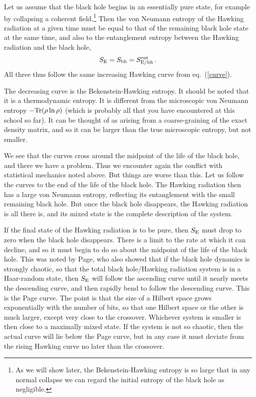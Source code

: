 \documentclass[12pt]{article}
\newcommand{\be}{\begin{equation}}
\newcommand{\ee}{\end{equation}}
\newcommand{\rmx}{\rm}
\begin{document}
Let us assume that the black hole begins in an essentially pure state, for example by collapsing a coherent field.\footnote{As we will show later, the Bekenstein-Hawking entropy is so large that in any normal collapse we can regard the initial entropy of the black hole as negligible.}  
Then the von Neumann entropy of the Hawking radiation at a given time must be equal to that of the remaining black hole state at the same time, and also to the entanglement entropy between the Hawking radiation and the black hole,
\be
S_{\rmx E} = S_{\rmx bh} = S^{\rmx ent}_{\rmx E/bh} \,.
\ee
All three thus follow the same increasing Hawking curve from eq.~(\ref{curve}).

The decreasing curve is the Bekenstein-Hawking entropy.  It should be noted that it is a thermodynamic entropy.  It is different from the microscopic von Neumann entropy $-\rm Tr( \rho\ln \rho)$ (which is probably all that you have encountered at this school so far).  It can be thought of as arising from a coarse-graining of the exact density matrix, and so it can be larger than the true microscopic entropy, but not smaller.  

We see that the curves cross around the midpoint of the life of the black hole, and there we have a problem.  Thus we encounter again the conflict with statistical mechanics noted above.
But things are worse than this.  Let us follow the curves to the end of the life of the black hole.  The Hawking radiation then has a large von Neumann entropy, reflecting its entanglement with the small remaining black hole.  But once the black hole disappears, the Hawking radiation is all there is, and its mixed state is the complete description of the system. 

If the final state of the Hawking radiation is to be pure, then $S_{\rmx E}$ must drop to zero when the black hole disappears.  There is a limit to the rate at which it can decline, and so it must begin to do so about the midpoint of the life of the black hole. This was noted by Page, who also showed that if the black hole dynamics is strongly chaotic, so that the total black hole/Hawking radiation system is in a Haar-random state, then $S_{\rmx E}$ will follow the ascending curve until it nearly meets the descending curve, and then rapidly bend  to follow the descending curve.  This is the Page curve\label{page}.
The point is that the size of a Hilbert space grows exponentially with the number of bits, so that one Hilbert space or the other is much larger, except very close to the crossover.  Whichever system is smaller is then close to a maximally mixed state.  
If the system is not so chaotic, then the actual curve will lie below the Page curve, but in any case it must deviate from the rising Hawking curve no later than the crossover.
\end{document}
